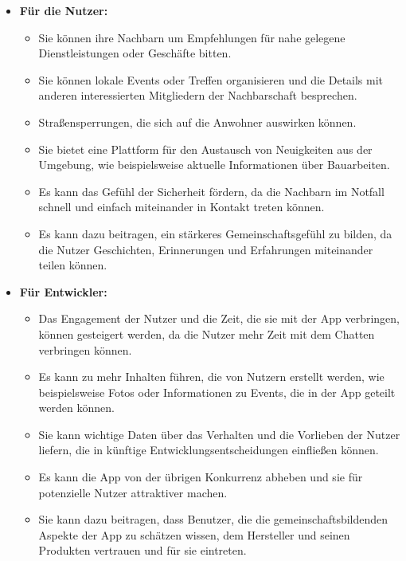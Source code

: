 \begin{itemize}
  \item \textbf{Für die Nutzer:}
        \begin{itemize}
          \item {Sie können ihre Nachbarn um Empfehlungen für nahe gelegene Dienstleistungen oder Geschäfte bitten.}
          \item {Sie können lokale Events oder Treffen organisieren und die Details mit anderen interessierten Mitgliedern der Nachbarschaft besprechen.}
          \item {Straßensperrungen, die sich auf die Anwohner auswirken können.}
          \item {Sie bietet eine Plattform für den Austausch von Neuigkeiten aus der Umgebung, wie beispielsweise aktuelle Informationen über Bauarbeiten.}
          \item {Es kann das Gefühl der Sicherheit fördern, da die Nachbarn im Notfall schnell und einfach miteinander in Kontakt treten können.}
          \item {Es kann dazu beitragen, ein stärkeres Gemeinschaftsgefühl zu bilden, da die Nutzer Geschichten, Erinnerungen und Erfahrungen miteinander teilen können.}
        \end{itemize}
\end{itemize}

\begin{itemize}
  \item \textbf{Für Entwickler:}
        \begin{itemize}
          \item {Das Engagement der Nutzer und die Zeit, die sie mit der App verbringen, können gesteigert werden, da die Nutzer mehr Zeit mit dem Chatten verbringen können.}
          \item {Es kann zu mehr Inhalten führen, die von Nutzern erstellt werden, wie beispielsweise Fotos oder Informationen zu Events, die in der App geteilt werden können.}
          \item {Sie kann wichtige Daten über das Verhalten und die Vorlieben der Nutzer liefern, die in künftige Entwicklungsentscheidungen einfließen können.}
          \item {Es kann die App von der übrigen Konkurrenz abheben und sie für potenzielle Nutzer attraktiver machen.}
          \item {Sie kann dazu beitragen, dass Benutzer, die die gemeinschaftsbildenden Aspekte der App zu schätzen wissen, dem Hersteller und seinen Produkten vertrauen und für sie eintreten.}
        \end{itemize}
\end{itemize}

